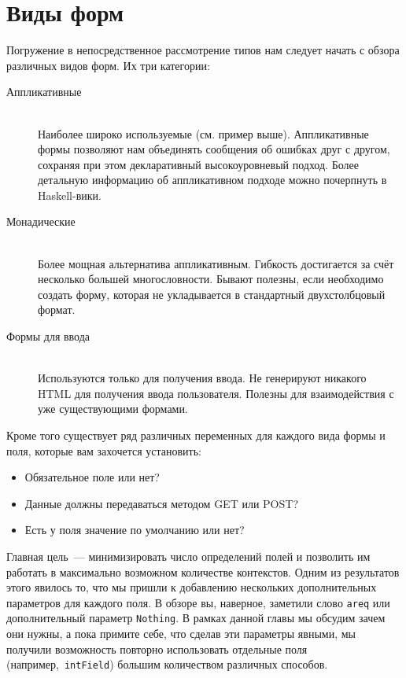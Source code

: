 \section{Виды форм}
Погружение в непосредственное рассмотрение типов нам следует начать с обзора
различных видов форм. Их три категории:
\begin{description}
    \item[Аппликативные] \hfill \\
        Наиболее широко используемые (см. пример выше). Аппликативные формы
        позволяют нам объединять сообщения об ошибках друг с другом, сохраняя
        при этом декларативный высокоуровневый подход. Более детальную
        информацию об аппликативном подходе можно почерпнуть
        в~%
        {Haskell-вики}.

    \item[Монадические] \hfill \\
        Более мощная альтернатива аппликативным. Гибкость достигается за счёт
        несколько большей многословности. Бывают полезны, если необходимо
        создать форму, которая не укладывается в стандартный двухстолбцовый
        формат.

    \item[Формы для ввода] \hfill \\
        Используются только для получения ввода. Не генерируют никакого HTML для
        получения ввода пользователя. Полезны для взаимодействия с уже
        существующими формами.
\end{description}

Кроме того существует ряд различных переменных для каждого вида формы и поля,
которые вам захочется установить:
\begin{itemize}
    \item Обязательное поле или нет?
    \item Данные должны передаваться методом GET или POST?
    \item Есть у поля значение по умолчанию или нет?
\end{itemize}

Главная цель~--- минимизировать число определений полей и позволить им
работать в максимально возможном количестве контекстов. Одним из результатов
этого явилось то, что мы пришли к добавлению нескольких дополнительных параметров для
каждого поля. В обзоре вы, наверное, заметили слово \lstinline'areq' или
дополнительный параметр \lstinline'Nothing'. В рамках данной главы мы обсудим
зачем они нужны, а пока примите себе, что сделав эти параметры явными, мы
получили возможность повторно использовать отдельные поля
(например,~\lstinline'intField') большим количеством различных способов.

